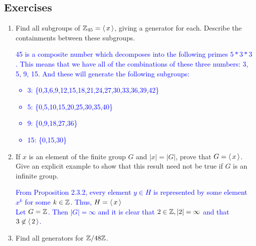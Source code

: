 \documentclass[10pt,a4paper]{report}
\newcommand{\BLUE}[1]{\textcolor{blue}{#1}}
\begin{document}
\subsection{Exercises}
\begin{enumerate}
	\item Find all subgroups of $\mathbb{Z}_{45}=\left \langle\, x \,\right \rangle$, giving a generator for each.  Describe the containments between these subgroups.
	
	\BLUE{45 is a composite number which decomposes into the following primes $5*3*3$.  This means that we have all of the combinations of these three numbers: 3, 5, 9, 15. And these will generate the following subgroups:
	\begin{itemize}
		\item 3: \{0,3,6,9,12,15,18,21,24,27,30,33,36,39,42\}
		\item 5: \{0,5,10,15,20,25,30,35,40\}
		\item 9: \{0,9,18,27,36\}
		\item 15: \{0,15,30\}
	\end{itemize}
	}
	
	\item If $x$ is an element of the finite group $G$ and $|x|=|G|$, prove that $G = \left \langle\, x \,\right \rangle$.  Give an explicit example to show that this result need not be true if $G$ is an infinite group.
	
	\BLUE{From Proposition 2.3.2, every element $y \in H$ is represented by some element $x^k$ for some $k\in \mathbb{Z}$.  Thus, $H = \left \langle\, x \,\right \rangle$\\
	Let $G = \mathbb{Z}$.  Then $|G|=\infty$ and it is clear that $2 \in \mathbb{Z}, |2| = \infty$ and that $3 \not \in \left \langle\, 2 \,\right \rangle$.
	}
	
	\item Find all generators for $\mathbb{Z}/48\mathbb{Z}$.
	

\end{enumerate}
\end{document}
